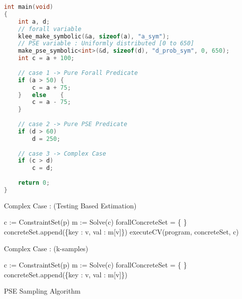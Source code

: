 \documentclass{article}
\begin{document}
\begin{lstlisting}[language=C++, caption={C++ code using listings}]
int main(void)
{
	int a, d;
	// forall variable
	klee_make_symbolic(&a, sizeof(a), "a_sym");
	// PSE variable : Uniformly distributed [0 to 650]
	make_pse_symbolic<int>(&d, sizeof(d), "d_prob_sym", 0, 650);
	int c = a + 100;
	
	// case 1 -> Pure Forall Predicate
	if (a > 50)	{
		c = a + 75;
	}	else	{
		c = a - 75;
	}
	
	// case 2 -> Pure PSE Predicate
	if (d > 60)
		d = 250;
	
	// case 3 -> Complex Case
	if (c > d)
		c = d;
	
	return 0;
}
\end{lstlisting}

\begin{algorithm}
    \caption{Complex Case : (Testing Based Estimation)}
    \begin{algorithmic}[1]
        \State c := ConstraintSet(p) 
        \State m := Solve(c) 
        \State forallConcreteSet = \{ \}
        	\State concreteSet.append(\{key : v, val : m[v]\}) 
        	\EndForEach
        \State executeCV(program, concreteSet, c)
        \EndForEach
    \end{algorithmic}
\end{algorithm}

\begin{algorithm}
	\caption{Complex Case : (k-samples)}
	\begin{algorithmic}[1]
		\State c := ConstraintSet(p) 
		\State m := Solve(c) 
		\State forallConcreteSet = \{ \}
			\State concreteSet.append(\{key : v, val : m[v]\}) 
			\EndForEach
		\EndForEach
	\end{algorithmic}
\end{algorithm}

\begin{algorithm}[H]
	\caption{PSE Sampling Algorithm}
	\begin{algorithmic}[1]
		\State{$\sigma[\mathtt{x}] = \delta$}
		\State{}
		\EndFunction
	\end{algorithmic}
\end{algorithm}
\end{document}
